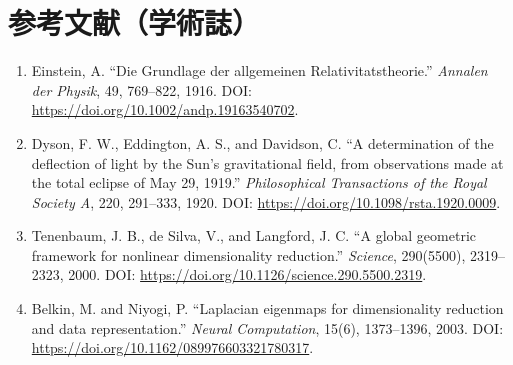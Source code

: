 \section*{参考文献（学術誌）}
\begin{enumerate}[leftmargin=2.4em]
\item Einstein, A. ``Die Grundlage der allgemeinen Relativitatstheorie.'' \textit{Annalen der Physik}, 49, 769--822, 1916. DOI: \url{https://doi.org/10.1002/andp.19163540702}.
\item Dyson, F. W., Eddington, A. S., and Davidson, C. ``A determination of the deflection of light by the Sun's gravitational field, from observations made at the total eclipse of May 29, 1919.'' \textit{Philosophical Transactions of the Royal Society A}, 220, 291--333, 1920. DOI: \url{https://doi.org/10.1098/rsta.1920.0009}.
\item Tenenbaum, J. B., de Silva, V., and Langford, J. C. ``A global geometric framework for nonlinear dimensionality reduction.'' \textit{Science}, 290(5500), 2319--2323, 2000. DOI: \url{https://doi.org/10.1126/science.290.5500.2319}.
\item Belkin, M. and Niyogi, P. ``Laplacian eigenmaps for dimensionality reduction and data representation.'' \textit{Neural Computation}, 15(6), 1373--1396, 2003. DOI: \url{https://doi.org/10.1162/089976603321780317}.
\end{enumerate}
